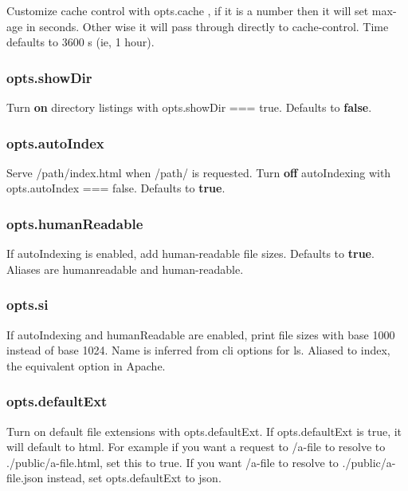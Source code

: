 Customize cache control with {\ttfamily opts.\+cache} , if it is a number then it will set max-\/age in seconds. Other wise it will pass through directly to cache-\/control. Time defaults to 3600 s (ie, 1 hour).

\subsubsection*{{\ttfamily opts.\+show\+Dir}}

Turn {\bfseries on} directory listings with {\ttfamily opts.\+show\+Dir === true}. Defaults to {\bfseries false}.

\subsubsection*{{\ttfamily opts.\+auto\+Index}}

Serve {\ttfamily /path/index.html} when {\ttfamily /path/} is requested. Turn {\bfseries off} auto\+Indexing with {\ttfamily opts.\+auto\+Index === false}. Defaults to {\bfseries true}.

\subsubsection*{{\ttfamily opts.\+human\+Readable}}

If auto\+Indexing is enabled, add human-\/readable file sizes. Defaults to {\bfseries true}. Aliases are {\ttfamily humanreadable} and {\ttfamily human-\/readable}.

\subsubsection*{{\ttfamily opts.\+si}}

If auto\+Indexing and human\+Readable are enabled, print file sizes with base 1000 instead of base 1024. Name is inferred from cli options for {\ttfamily ls}. Aliased to {\ttfamily index}, the equivalent option in Apache.

\subsubsection*{{\ttfamily opts.\+default\+Ext}}

Turn on default file extensions with {\ttfamily opts.\+default\+Ext}. If {\ttfamily opts.\+default\+Ext} is true, it will default to {\ttfamily html}. For example if you want a request to {\ttfamily /a-\/file} to resolve to {\ttfamily ./public/a-\/file.html}, set this to {\ttfamily true}. If you want {\ttfamily /a-\/file} to resolve to {\ttfamily ./public/a-\/file.json} instead, set {\ttfamily opts.\+default\+Ext} to {\ttfamily json}.

